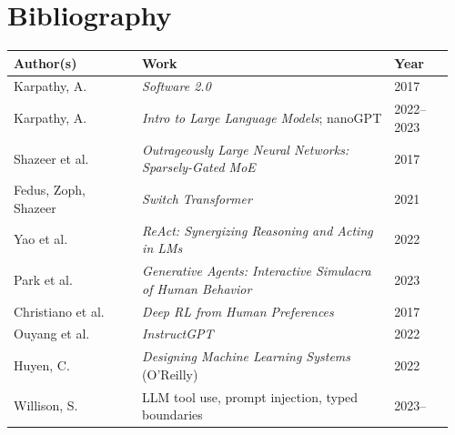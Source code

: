 




\makespecheader

\section{Bibliography}

\begin{longtable}{@{}p{0.28\linewidth}p{0.55\linewidth}p{0.13\linewidth}@{}}
\toprule
\textbf{Author(s)} & \textbf{Work} & \textbf{Year} \\
\midrule
\endhead

Karpathy, A.         & \emph{Software 2.0}                                               & 2017 \\
Karpathy, A.         & \emph{Intro to Large Language Models}; nanoGPT                    & 2022--2023 \\
Shazeer et al.       & \emph{Outrageously Large Neural Networks: Sparsely-Gated MoE}     & 2017 \\
Fedus, Zoph, Shazeer & \emph{Switch Transformer}                                         & 2021 \\
Yao et al.           & \emph{ReAct: Synergizing Reasoning and Acting in LMs}             & 2022 \\
Park et al.          & \emph{Generative Agents: Interactive Simulacra of Human Behavior} & 2023 \\
Christiano et al.    & \emph{Deep RL from Human Preferences}                             & 2017 \\
Ouyang et al.        & \emph{InstructGPT}                                                & 2022 \\
Huyen, C.            & \emph{Designing Machine Learning Systems} (O'Reilly)              & 2022 \\
Willison, S.         & LLM tool use, prompt injection, typed boundaries                  & 2023-- \\

\bottomrule
\end{longtable}


